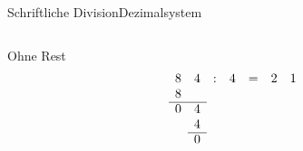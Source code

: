 \documentclass[xelatex,aspectratio=169]{beamer}
\begin{document}
\begin{frame}[t]{Schriftliche Division}{Dezimalsystem}
  \vspace{-\baselineskip}
  \begin{columns}
    \begin{column}{0.5\textwidth}
      \begin{block}{Ohne Rest}
        \[
          \begin{matrix}
            8 & 4 & : & 4 & = & 2 & 1 \\
            8 &   &   &   &   &   &   \\
            \cline{1-2}
            0 & 4 &   &   &   &   &   \\
              & 4 &   &   &   &   &   \\
            \cline{2-2}
              & 0 &   &   &   &   &   \\
          \end{matrix}
        \]

      \end{block}
\end{column}
\end{columns}
\end{frame}
\end{document}
